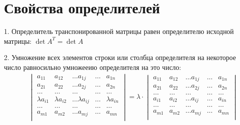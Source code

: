 \documentclass[12pt, fleqn]{extarticle}
\begin{document}
\newpage

\section{Свойства определителей}\label{sec:det}

1. Определитель транспонированной матрицы равен определителю исходной матрицы: \(\det A^T = \det A\)

2. Умножение всех элементов строки или столбца определителя на некоторое число \lambda равносильно умножееию определителя на это число:
\begin{align*}
     &  &
    \begin{vmatrix}
        a_{11}         & a_{12}         & \dots a_{1j}         & \dots & a_{1n}         \\
        a_{21}         & a_{22}         & \dots a_{2j}         & \dots & a_{2n}         \\
        \dots          & \dots          & \dots                & \dots & \dots          \\
        \lambda a_{i1} & \lambda a_{i2} & \dots \lambda a_{ij} & \dots & \lambda a_{in} \\
        \dots          & \dots          & \dots                & \dots & \dots          \\
        a_{m1}         & a_{m2}         & \dots a_{mj}         & \dots & a_{mn}         \\
    \end{vmatrix}
    =
    \lambda \cdot
    \begin{vmatrix}
        a_{11} & a_{12} & \dots a_{1j} & \dots & a_{1n} \\
        a_{21} & a_{22} & \dots a_{2j} & \dots & a_{2n} \\
        \dots  & \dots  & \dots        & \dots & \dots  \\
        a_{i1} & a_{i2} & \dots a_{ij} & \dots & a_{in} \\
        \dots  & \dots  & \dots        & \dots & \dots  \\
        a_{m1} & a_{m2} & \dots a_{mj} & \dots & a_{mn} \\
    \end{vmatrix}
\end{align*}
\end{document}
